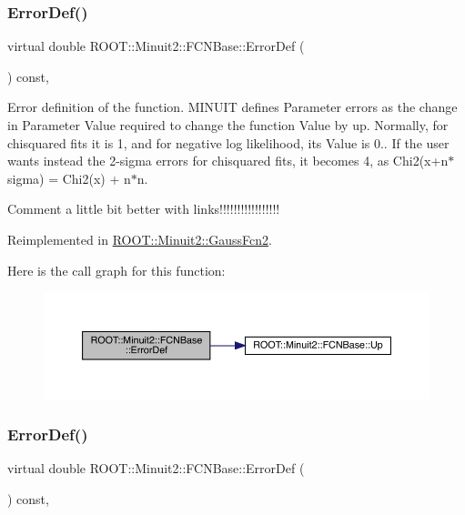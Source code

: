 \subsubsection{\texorpdfstring{ErrorDef()}{ErrorDef()}\hspace{0.1cm}{\footnotesize\ttfamily [1/2]}}
{\footnotesize\ttfamily virtual double R\+O\+O\+T\+::\+Minuit2\+::\+F\+C\+N\+Base\+::\+Error\+Def (\begin{DoxyParamCaption}{ }\end{DoxyParamCaption}) const\hspace{0.3cm}{\ttfamily [inline]}, {\ttfamily [virtual]}}

Error definition of the function. M\+I\+N\+U\+IT defines Parameter errors as the change in Parameter Value required to change the function Value by up. Normally, for chisquared fits it is 1, and for negative log likelihood, its Value is 0.. If the user wants instead the 2-\/sigma errors for chisquared fits, it becomes 4, as Chi2(x+n$\ast$sigma) = Chi2(x) + n$\ast$n.

Comment a little bit better with links!!!!!!!!!!!!!!!!! 

Reimplemented in \mbox{\hyperlink{classROOT_1_1Minuit2_1_1GaussFcn2_ac240f7b6ecbb7bf842d786e3914c620a}{R\+O\+O\+T\+::\+Minuit2\+::\+Gauss\+Fcn2}}.

Here is the call graph for this function\+:
\nopagebreak
\begin{figure}[H]
\begin{center}
\leavevmode
\includegraphics[width=350pt]{dd/df4/classROOT_1_1Minuit2_1_1FCNBase_ac4592475c58a65b037ba97ab5f3cba10_cgraph}
\end{center}
\end{figure}
\mbox{\label{classROOT_1_1Minuit2_1_1FCNBase_ac4592475c58a65b037ba97ab5f3cba10}} 
\subsubsection{\texorpdfstring{ErrorDef()}{ErrorDef()}\hspace{0.1cm}{\footnotesize\ttfamily [2/2]}}
{\footnotesize\ttfamily virtual double R\+O\+O\+T\+::\+Minuit2\+::\+F\+C\+N\+Base\+::\+Error\+Def (\begin{DoxyParamCaption}{ }\end{DoxyParamCaption}) const\hspace{0.3cm}{\ttfamily [inline]}, {\ttfamily [virtual]}}


